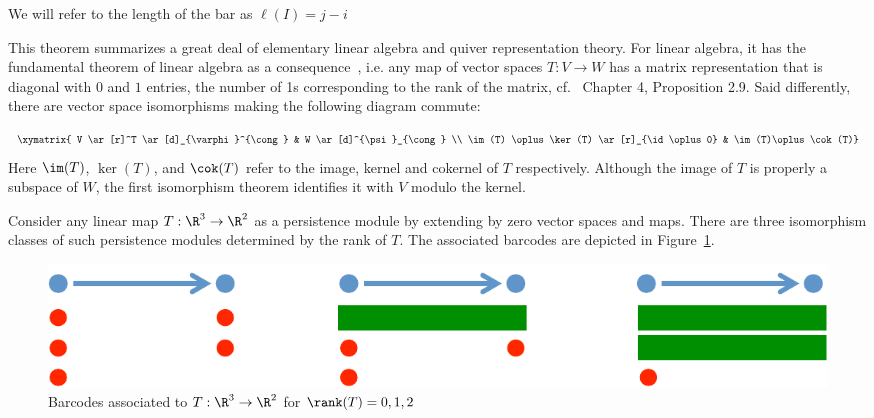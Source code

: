 \begin{rem}

We will refer to the length of the bar as $\ell(I)=j-i$

\end{rem}

This theorem summarizes a great deal of elementary linear algebra and quiver representation theory. For linear algebra, it has the fundamental theorem of linear algebra as a consequence~\cite{strang1993fundamental}, i.e. any map of vector spaces $T:V\to W$ has a matrix representation that is diagonal with $0$ and $1$ entries, the number of 1s corresponding to the rank of the matrix, cf.~\cite{artin1991algebra} Chapter 4, Proposition 2.9. Said differently, there are vector space isomorphisms making the following diagram commute:

\[
    \xymatrix{ V \ar[r]^T \ar[d]_{\varphi}^{\cong} & W \ar[d]^{\psi}_{\cong} \\
    \im(T) \oplus \ker(T) \ar[r]_{\id\oplus 0} & \im(T)\oplus \cok(T)}
\]
Here $\im(T)$, $\ker(T)$, and $\cok(T)$ refer to the image, kernel and cokernel of $T$ respectively. Although the image of $T$ is properly a subspace of $W$, the first isomorphism theorem identifies it with $V$ modulo the kernel.

\begin{ex}

Consider any linear map $T:\R^3\to\R^2$ as a persistence module by extending by zero vector spaces and maps. There are three isomorphism classes of such persistence modules determined by the rank of $T$. The associated barcodes are depicted in Figure~\ref{fig:rank012bars}.

\end{ex}

\begin{figure}
    \centering
    \includegraphics[width=.8\textwidth]{rank_bcs.pdf}
    \caption{Barcodes associated to $T:\R^3\to\R^2$ for $\rank(T)=0,1,2$}
    \label{fig:rank012bars}
\end{figure}

